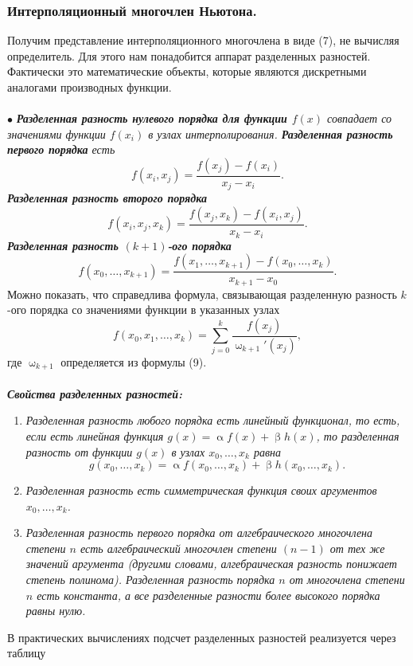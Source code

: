 \documentclass[a4paper, 12pt]{report}
\numberwithin{equation}{section}
\renewcommand{\alpha}{\upalpha}
\renewcommand{\beta}{\upbeta}
\renewcommand{\omega}{\upomega}
\begin{document}
	\subsubsection{Интерполяционный многочлен Ньютона.}
	Получим представление интерполяционного многочлена в виде (7), не вычисляя определитель. Для этого нам понадобится аппарат разделенных разностей. Фактически это математические объекты, которые являются дискретными аналогами производных функции.\\\\
	$\bullet$ \textit{\textbf{Разделенная разность нулевого порядка для функции $f(x)$} совпадает со значениями функции $f(x_i)$ в узлах интерполирования. \textbf{Разделенная разность первого порядка} есть $$f(x_i, x_j) = \dfrac{f(x_j) - f(x_i)}{x_j - x_i}.$$
	\textbf{Разделенная разность второго порядка} $$f(x_i, x_j, x_k) = \dfrac{f(x_j, x_k) - f(x_i, x_j)}{x_k - x_i}.$$ \textbf{Разделенная разность $(k+1)$-ого порядка}} $$f(x_0, \ldots, x_{k+1}) = \dfrac{f(x_1,\ldots, x_{k+1}) - f(x_0,\ldots, x_k)}{x_{k+1} - x_0}.$$
	Можно показать, что справедлива формула, связывающая разделенную разность $k$-ого порядка со значениями функции в указанных узлах
	\begin{equation}
		f(x_0, x_1,\ldots, x_k) = \sum_{j=0}^{k} \dfrac{f(x_j)}{\omega_{k+1}'(x_j)},
	\end{equation}
	где $\omega_{k+1}$ определяется из формулы (9).\\\\
	\textbf{\textit{Свойства разделенных разностей:}}
	\begin{enumerate}
		\item \textit{Разделенная разность любого порядка есть линейный функционал, то есть, если есть линейная функция $g(x) = \alpha f(x) + \beta h(x)$, то разделенная разность от функции $g(x)$ в узлах $x_0,\ldots, x_k$ равна} $$g(x_0,\ldots, x_k) = \alpha f(x_0,\ldots, x_k) + \beta h(x_0,\ldots, x_k).$$
		\item \textit{Разделенная разность есть симметрическая функция своих аргументов $x_0,\ldots, x_k$.}
		\item \textit{Разделенная разность первого порядка от алгебраического многочлена степени $n$ есть алгебраический многочлен степени $(n-1)$ от тех же значений аргумента (другими словами, алгебраическая разность понижает степень полинома). Разделенная разность порядка $n$ от многочлена степени $n$ есть константа, а все разделенные разности более высокого порядка равны нулю.}
	\end{enumerate}
	В практических вычислениях подсчет разделенных разностей реализуется через таблицу
\end{document}
